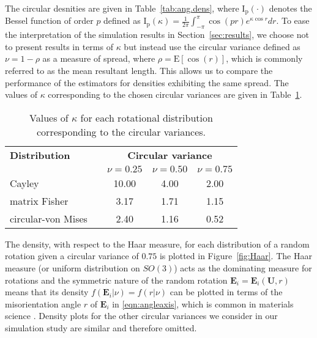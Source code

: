The circular desnities are given in Table~\ref{tab:ang.dens}, where $\mathrm{I_p}(\cdot)$ denotes the Bessel function of order $p$ defined as  $\mathrm{I_p}(\kappa)=\frac{1}{2\pi}\int_{-\pi}^{\pi}\cos(pr)e^{\kappa\cos r}dr$. To ease the interpretation of the simulation results in Section~\ref{sec:results},  we choose not to present results in terms of $\kappa$ but instead use the circular variance defined as $\nu=1-\rho$ as a measure of spread, where $\rho=\mathrm{E}[\cos(r)]$, which is commonly referred to as the mean resultant length. This allows us to compare the performance of the estimators for densities exhibiting the same spread.  The values of $\kappa$ corresponding to the chosen circular variances are given in Table~\ref{tab:kappas}.  \\


\begin{table}[h!]
\begin{center}
\caption{Values of $\kappa$ for each rotational distribution corresponding to the circular variances.  \label{tab:kappas}}\vspace{-0.4cm}
\begin{tabular}{l l ccc}\hline
{\bf Distribution} & & \multicolumn{3}{c}{\bf Circular variance} \\
& & $\nu=0.25$ &$\nu=0.50$ & $\nu=0.75$\\ \hline \hline
Cayley & & 10.00 & 4.00 & 2.00 \\
matrix Fisher & & 3.17 & 1.71 & 1.15\\
circular-von Mises & & 2.40 & 1.16 & 0.52\\ \hline
\end{tabular}
\end{center}
\end{table}

The density, with respect to the Haar measure, for each distribution of a random rotation given a circular variance of $0.75$ is plotted in Figure~\ref{fig:Haar}.  The Haar measure (or uniform distribution on $SO(3)$) acts as the dominating measure for rotations and the symmetric nature of the random rotation $\bm E_i=\bm E_i(\bm U,r)$ means that its density $f(\bm E_i|\nu)=f(r|\nu)$ can be plotted in terms of the misorientation angle $r$ of $\bm E_i$ in \eqref{eqn:angleaxis}, which is common in materials science \citep{matthies88, savyolova95}.  Density plots for the other circular variances we consider in our simulation study are similar and therefore omitted.


